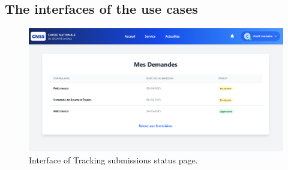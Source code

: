 \subsection{The interfaces of the use cases}
\begin{figure}[h!]
    \centering
    \includegraphics[width=1\textwidth]{figures/ui-track sub status.png}
    \caption{Interface of Tracking submissions status page.}
\end{figure}


